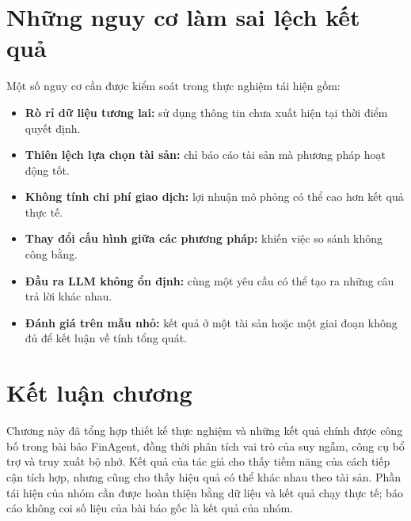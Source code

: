 \section{Những nguy cơ làm sai lệch kết quả}

Một số nguy cơ cần được kiểm soát trong thực nghiệm tái hiện gồm:
\begin{itemize}
    \item \textbf{Rò rỉ dữ liệu tương lai:} sử dụng thông tin chưa xuất hiện tại thời điểm quyết định.
    \item \textbf{Thiên lệch lựa chọn tài sản:} chỉ báo cáo tài sản mà phương pháp hoạt động tốt.
    \item \textbf{Không tính chi phí giao dịch:} lợi nhuận mô phỏng có thể cao hơn kết quả thực tế.
    \item \textbf{Thay đổi cấu hình giữa các phương pháp:} khiến việc so sánh không công bằng.
    \item \textbf{Đầu ra LLM không ổn định:} cùng một yêu cầu có thể tạo ra những câu trả lời khác nhau.
    \item \textbf{Đánh giá trên mẫu nhỏ:} kết quả ở một tài sản hoặc một giai đoạn không đủ để kết luận về tính tổng quát.
\end{itemize}

\section{Kết luận chương}
Chương này đã tổng hợp thiết kế thực nghiệm và những kết quả chính được công bố trong bài báo FinAgent, đồng thời phân tích vai trò của suy ngẫm, công cụ bổ trợ và truy xuất bộ nhớ. Kết quả của tác giả cho thấy tiềm năng của cách tiếp cận tích hợp, nhưng cũng cho thấy hiệu quả có thể khác nhau theo tài sản. Phần tái hiện của nhóm cần được hoàn thiện bằng dữ liệu và kết quả chạy thực tế; báo cáo không coi số liệu của bài báo gốc là kết quả của nhóm.
